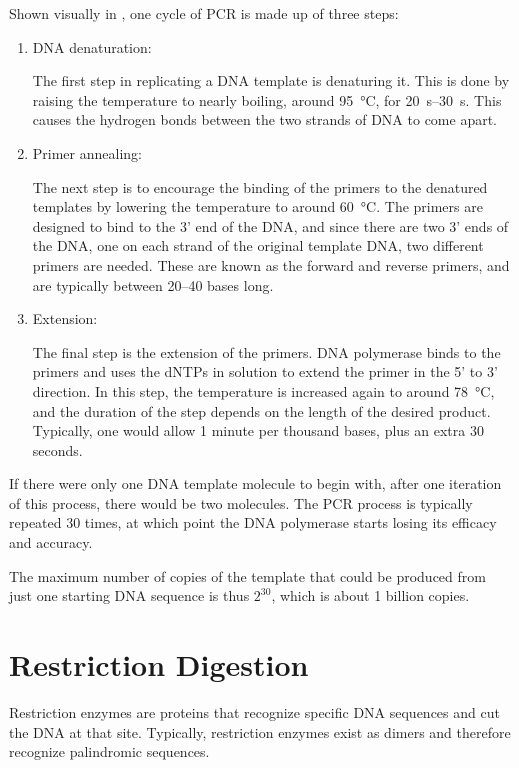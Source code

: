 Shown visually in , one cycle of PCR is made up of three steps:

\begin{enumerate}
\item DNA denaturation:

The first step in replicating a DNA template is denaturing it. This is done by raising the temperature to nearly boiling, around \qty{95}{\degreeCelsius}, for \qtyrange{20}{30}{\second}. This causes the hydrogen bonds between the two strands of DNA to come apart.

\item Primer annealing:

The next step is to encourage the binding of the primers to the denatured templates by lowering the temperature to around \qty{60}{\degreeCelsius}. The primers are designed to bind to the 3' end of the DNA, and since there are two 3' ends of the DNA, one on each strand of the original template DNA, two different primers are needed. These are known as the forward and reverse primers, and are typically between \numrange{20}{40} bases long.

\item Extension:

The final step is the extension of the primers. DNA polymerase binds to the primers and uses the dNTPs in solution to extend the primer in the 5' to 3' direction. In this step, the temperature is increased again to around \qty{78}{\degreeCelsius}, and the duration of the step depends on the length of the desired product. Typically, one would allow \num{1} minute per thousand bases, plus an extra \num{30} seconds.

\end{enumerate}

If there were only one DNA template molecule to begin with, after one iteration of this process, there would be two molecules. The PCR process is typically repeated \num{30} times, at which point the DNA polymerase starts losing its efficacy and accuracy.

The maximum number of copies of the template that could be produced from just one starting DNA sequence is thus \(2^{30}\), which is about \num{1} billion copies.

\section{Restriction Digestion}

Restriction enzymes are proteins that recognize specific DNA sequences and cut the DNA at that site. Typically, restriction enzymes exist as dimers and therefore recognize palindromic sequences.

